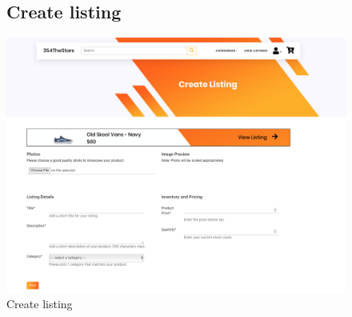 \documentclass[11pt]{article}
\begin{document}
\begin{figure}[ht!]
    \subsection{Create listing}
    \centering
    \includegraphics[width=\textwidth,height=0.3\paperheight,keepaspectratio]{Diagrams/External_Interfaces/Create_Listing.png}
    \caption{Create listing}
    \label{fig: Latest listings}
\end{figure}
\FloatBarrier
\end{document}
